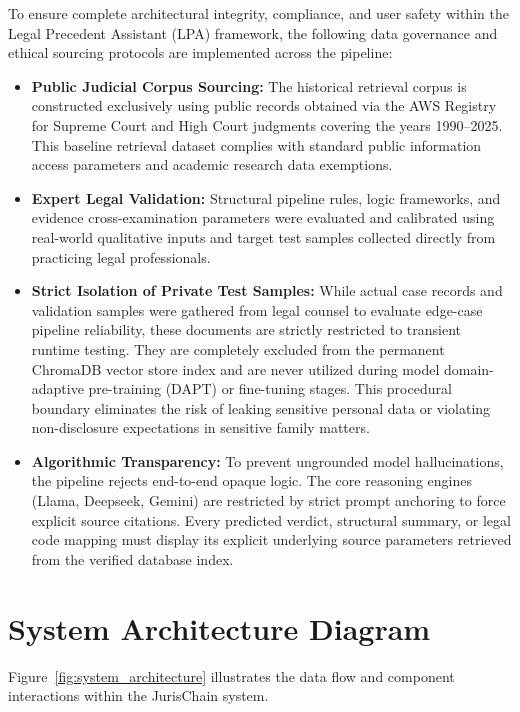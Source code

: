To ensure complete architectural integrity, compliance, and user safety within the Legal Precedent Assistant (LPA) framework, the following data governance and ethical sourcing protocols are implemented across the pipeline:
\begin{itemize}
	\item \textbf{Public Judicial Corpus Sourcing:} The historical retrieval corpus is constructed exclusively using public records obtained via the AWS Registry for Supreme Court and High Court judgments covering the years 1990–2025. This baseline retrieval dataset complies with standard public information access parameters and academic research data exemptions.
	\item \textbf{Expert Legal Validation:} Structural pipeline rules, logic frameworks, and evidence cross-examination parameters were evaluated and calibrated using real-world qualitative inputs and target test samples collected directly from practicing legal professionals.
	\item \textbf{Strict Isolation of Private Test Samples:} While actual case records and validation samples were gathered from legal counsel to evaluate edge-case pipeline reliability, these documents are strictly restricted to transient runtime testing. They are completely excluded from the permanent ChromaDB vector store index and are never utilized during model domain-adaptive pre-training (DAPT) or fine-tuning stages. This procedural boundary eliminates the risk of leaking sensitive personal data or violating non-disclosure expectations in sensitive family matters.
	\item \textbf{Algorithmic Transparency:} To prevent ungrounded model hallucinations, the pipeline rejects end-to-end opaque logic. The core reasoning engines (Llama, Deepseek, Gemini) are restricted by strict prompt anchoring to force explicit source citations. Every predicted verdict, structural summary, or legal code mapping must display its explicit underlying source parameters retrieved from the verified database index.
\end{itemize}




\newpage

\section{System Architecture Diagram}

Figure~\ref{fig:system_architecture} illustrates the data flow and component interactions within the JurisChain system.

